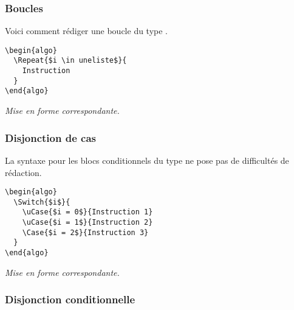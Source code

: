\documentclass[12pt,a4paper]{article}
\theoremstyle{definition}
\newenvironment{frame-gene}[1][]{
	\begin{tcolorbox}[
		title        = #1, 
		colbacktitle = black!10!white, 
		colback      = white, 
		coltitle     = black,
		fonttitle    = \bfseries\itshape\small, 
		breakable,
		center title]
}{
	\end{tcolorbox}
}
\begin{document}
\subsubsection{Boucles \TTrepeat{}}

Voici comment rédiger une boucle du type \TTrepeat{}.


\begin{multicols}{2}
    \centering
    \begin{frame-gene}
\begin{verbatim}
\begin{algo}
  \Repeat{$i \in uneliste$}{
    Instruction 
  }
\end{algo}
\end{verbatim}
    \end{frame-gene}
    \vfill\null
    \columnbreak
    \textit{Mise en forme correspondante.}
\begin{algo}
\end{algo}
    \vfill\null
\end{multicols}


\subsubsection{Disjonction de cas \TTswitch{}}

La syntaxe pour les blocs conditionnels du type \TTswitch{} ne pose pas de difficultés de rédaction.


\begin{multicols}{2}
    \centering
    \begin{frame-gene}
\begin{verbatim}
\begin{algo}
  \Switch{$i$}{
    \uCase{$i = 0$}{Instruction 1}
    \uCase{$i = 1$}{Instruction 2}
    \Case{$i = 2$}{Instruction 3}
  }
\end{algo}
\end{verbatim}
    \end{frame-gene}
    \vfill\null
    \columnbreak
    \textit{Mise en forme correspondante.}
\begin{algo}
\end{algo}
    \vfill\null
\end{multicols}


\subsubsection{Disjonction conditionnelle \TTif{}}
\end{document}
